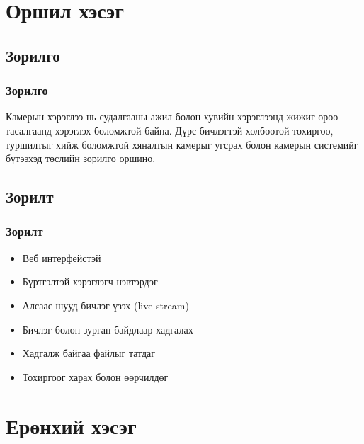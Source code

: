 \section{Оршил хэсэг} 

\subsection{Зорилго} 

\begin{frame}
\frametitle{Зорилго}
\begin{block}{}
\justifying
Камерын хэрэглээ нь судалгааны ажил болон хувийн хэрэглээнд жижиг өрөө тасалгаанд хэрэглэх боломжтой байна. Дүрс бичлэгтэй холбоотой тохиргоо, туршилтыг хийж боломжтой хяналтын камерыг угсрах болон камерын системийг бүтээхэд төслийн зорилго оршино.
\end{block}
\end{frame}

\subsection{Зорилт} 

\begin{frame}
\frametitle{Зорилт}
\begin{itemize}
\item Веб интерфейстэй 
\item Бүртгэлтэй хэрэглэгч нэвтэрдэг
\item Алсаас шууд бичлэг үзэх (live stream)
\item Бичлэг болон зурган байдлаар хадгалах
\item Хадгалж байгаа файлыг татдаг
\item Тохиргоог харах болон өөрчилдөг 
\end{itemize}
\end{frame}



\section{Ерөнхий хэсэг} 

